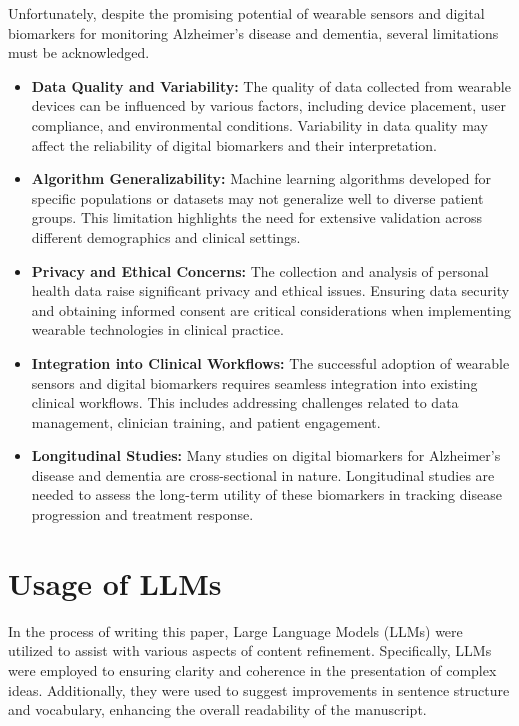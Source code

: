 \documentclass[sigconf,nonacm]{acmart}
\begin{document}
    Unfortunately, despite the promising potential of wearable sensors and digital biomarkers for monitoring Alzheimer's disease and dementia, several limitations must be acknowledged.

    \begin{itemize}
        \item \textbf{Data Quality and Variability:} The quality of data collected from wearable devices can be influenced by various factors, including device placement, user compliance, and environmental conditions. Variability in data quality may affect the reliability of digital biomarkers and their interpretation.

        \item \textbf{Algorithm Generalizability:} Machine learning algorithms developed for specific populations or datasets may not generalize well to diverse patient groups. This limitation highlights the need for extensive validation across different demographics and clinical settings.

        \item \textbf{Privacy and Ethical Concerns:} The collection and analysis of personal health data raise significant privacy and ethical issues. Ensuring data security and obtaining informed consent are critical considerations when implementing wearable technologies in clinical practice.

        \item \textbf{Integration into Clinical Workflows:} The successful adoption of wearable sensors and digital biomarkers requires seamless integration into existing clinical workflows. This includes addressing challenges related to data management, clinician training, and patient engagement.

        \item \textbf{Longitudinal Studies:} Many studies on digital biomarkers for Alzheimer's disease and dementia are cross-sectional in nature. Longitudinal studies are needed to assess the long-term utility of these biomarkers in tracking disease progression and treatment response.
    \end{itemize}

\section{Usage of LLMs}

    In the process of writing this paper, Large Language Models (LLMs) were utilized to assist with various aspects of content refinement. Specifically, LLMs were employed to ensuring clarity and coherence in the presentation of complex ideas. Additionally, they were used to suggest improvements in sentence structure and vocabulary, enhancing the overall readability of the manuscript.
\end{document}
